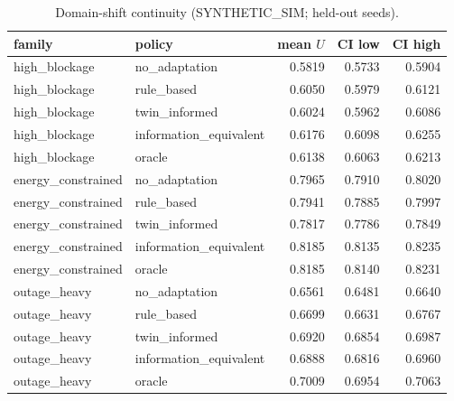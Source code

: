 \begin{table}[h]\centering
\caption{Domain-shift continuity (SYNTHETIC\_SIM; held-out seeds).}
\begin{tabular}{llrrr}\toprule family & policy & mean $U$ & CI low & CI high \\\midrule
high\_blockage & no\_adaptation & 0.5819 & 0.5733 & 0.5904 \\
high\_blockage & rule\_based & 0.6050 & 0.5979 & 0.6121 \\
high\_blockage & twin\_informed & 0.6024 & 0.5962 & 0.6086 \\
high\_blockage & information\_equivalent & 0.6176 & 0.6098 & 0.6255 \\
high\_blockage & oracle & 0.6138 & 0.6063 & 0.6213 \\
energy\_constrained & no\_adaptation & 0.7965 & 0.7910 & 0.8020 \\
energy\_constrained & rule\_based & 0.7941 & 0.7885 & 0.7997 \\
energy\_constrained & twin\_informed & 0.7817 & 0.7786 & 0.7849 \\
energy\_constrained & information\_equivalent & 0.8185 & 0.8135 & 0.8235 \\
energy\_constrained & oracle & 0.8185 & 0.8140 & 0.8231 \\
outage\_heavy & no\_adaptation & 0.6561 & 0.6481 & 0.6640 \\
outage\_heavy & rule\_based & 0.6699 & 0.6631 & 0.6767 \\
outage\_heavy & twin\_informed & 0.6920 & 0.6854 & 0.6987 \\
outage\_heavy & information\_equivalent & 0.6888 & 0.6816 & 0.6960 \\
outage\_heavy & oracle & 0.7009 & 0.6954 & 0.7063 \\
\bottomrule\end{tabular}\end{table}
